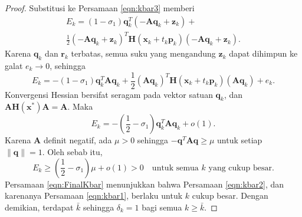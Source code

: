 \begin{proof}
Substitusi ke Persamaan \ref{eqn:kbar3} memberi
\begin{multline}
E_k=(1-\sigma_1)\mathbf{q}_k^T(-\mathbf{A}\mathbf{q}_k+\mathbf{z}_k)+\\
\frac12(-\mathbf{A}\mathbf{q}_k+\mathbf{z}_k)^T
\mathbf{H}(\mathbf{x}_k+t_k\mathbf{p}_k)
(-\mathbf{A}\mathbf{q}_k+\mathbf{z}_k).
\end{multline}
Karena $\mathbf{q}_k$ dan $\mathbf{r}_k$ terbatas, semua suku yang mengandung $\mathbf{z}_k$ dapat dihimpun ke galat $e_k\to0$, sehingga
\begin{equation}
E_k=-(1-\sigma_1)\mathbf{q}_k^T\mathbf{A}\mathbf{q}_k
+\frac12(\mathbf{A}\mathbf{q}_k)^T
\mathbf{H}(\mathbf{x}_k+t_k\mathbf{p}_k)
(\mathbf{A}\mathbf{q}_k)+e_k.
\end{equation}
Konvergensi Hessian bersifat seragam pada vektor satuan $\mathbf{q}_k$, dan $\mathbf{A}\mathbf{H}(\mathbf{x}^*)\mathbf{A}=\mathbf{A}$. Maka
\begin{equation}
E_k=-\left(\frac12-\sigma_1\right)
\mathbf{q}_k^T\mathbf{A}\mathbf{q}_k+o(1).
\end{equation}
Karena $\mathbf{A}$ definit negatif, ada $\mu>0$ sehingga $-\mathbf{q}^T\mathbf{A}\mathbf{q}\geq\mu$ untuk setiap $\lVert\mathbf{q}\rVert=1$. Oleh sebab itu,
\begin{equation}
E_k\geq\left(\frac12-\sigma_1\right)\mu+o(1)>0
\quad\text{untuk semua $k$ yang cukup besar}.
\label{eqn:FinalKbar}
\end{equation}
Persamaan \ref{eqn:FinalKbar} menunjukkan bahwa Persamaan \ref{eqn:kbar2}, dan karenanya Persamaan \ref{eqn:kbar1}, berlaku untuk $k$ cukup besar. Dengan demikian, terdapat $\bar{k}$ sehingga $\delta_k=1$ bagi semua $k\geq\bar{k}$.


\end{proof}
